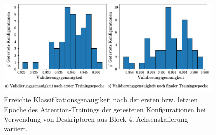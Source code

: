\begin{figure}[h]
\includegraphics[scale=0.75]{NNOPT/Anhang/layer4_int_and_end_perf_attention.pdf}
\caption{Erreichte Klassifikationsgenaugikeit nach der ersten bzw. letzten Epoche des Attention-Trainings der getesteten Konfigurationen bei Verwendung von Deskriptoren aus \mbox{Block-4}. Achsenskalierung variiert.}
\label{hyperopt_layer4_1}
\end{figure}

